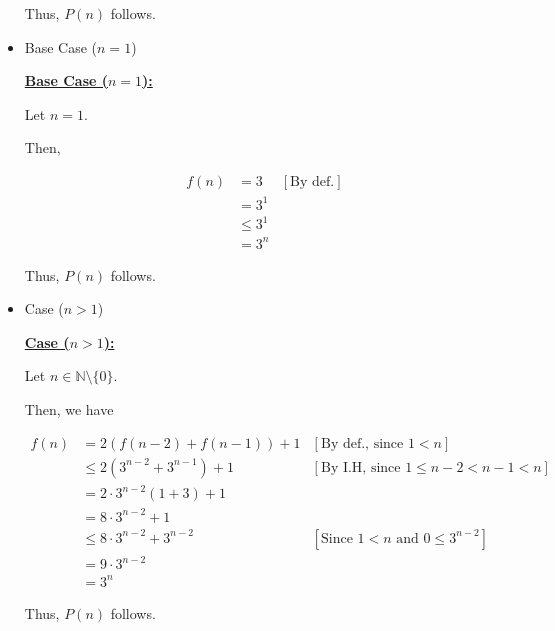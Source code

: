 \documentclass[12pt]{article}
\begin{document}
\begin{mdframed}
\begin{itemize}
\begin{mdframed}
        \bigskip

        Thus, $P(n)$ follows.

        \end{mdframed}

        \item Base Case ($n = 1$)

        \begin{mdframed}

        \underline{\textbf{Base Case ($n = 1$):}}

        \bigskip

        Let $n = 1$.

        \bigskip

        Then,

        \begin{align}
            f(n) &= 3 & [\text{By def.}]\\
            &= 3^1\\
            &\leq 3^1\\
            &= 3^n
        \end{align}

        \bigskip

        Thus, $P(n)$ follows.

        \end{mdframed}
        \item Case ($n > 1$)

        \begin{mdframed}
            \underline{\textbf{Case ($n > 1$):}}

            \bigskip

            Let $n \in \mathbb{N} \setminus \{0\}$.

            \bigskip

            Then, we have

            \begin{align}
                f(n) &= 2(f(n-2) + f(n-1)) + 1 & [\text{By def., since $1 < n$}]\\
                &\leq 2(3^{n-2} + 3^{n-1}) + 1 & [\text{By I.H, since $1 \leq n-2 < n-1 < n$}]\\
                &= 2 \cdot 3^{n-2}(1 + 3) + 1\\
                &= 8 \cdot 3^{n-2} + 1 \\
                &\leq 8 \cdot 3^{n-2} + 3^{n-2} & [\text{Since $1 < n$ and $0 \leq 3^{n-2}$}]\\
                &= 9 \cdot 3^{n-2}\\
                &= 3^n
            \end{align}

            \bigskip

            Thus, $P(n)$ follows.
        \end{mdframed}
    \end{itemize}

\end{mdframed}
\end{document}
